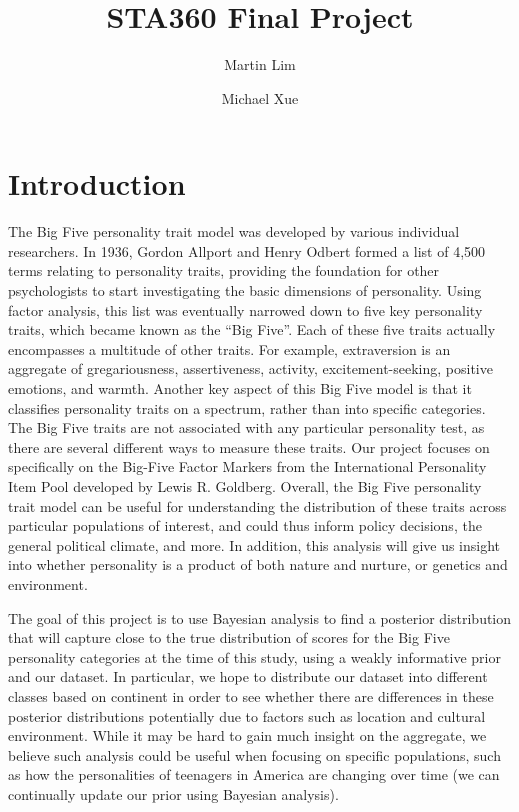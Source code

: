\documentclass[
]{article}
\title{STA360 Final Project}
\author{Martin Lim \and Michael Xue}
\date{}
\begin{document}
\maketitle

\hypertarget{introduction}{%
\section{Introduction}\label{introduction}}

The Big Five personality trait model was developed by various individual
researchers. In 1936, Gordon Allport and Henry Odbert formed a list of
4,500 terms relating to personality traits, providing the foundation for
other psychologists to start investigating the basic dimensions of
personality. Using factor analysis, this list was eventually narrowed
down to five key personality traits, which became known as the ``Big
Five''. Each of these five traits actually encompasses a multitude of
other traits. For example, extraversion is an aggregate of
gregariousness, assertiveness, activity, excitement-seeking, positive
emotions, and warmth. Another key aspect of this Big Five model is that
it classifies personality traits on a spectrum, rather than into
specific categories. The Big Five traits are not associated with any
particular personality test, as there are several different ways to
measure these traits. Our project focuses on specifically on the
Big-Five Factor Markers from the International Personality Item Pool
developed by Lewis R. Goldberg. Overall, the Big Five personality trait
model can be useful for understanding the distribution of these traits
across particular populations of interest, and could thus inform policy
decisions, the general political climate, and more. In addition, this
analysis will give us insight into whether personality is a product of
both nature and nurture, or genetics and environment.

The goal of this project is to use Bayesian analysis to find a posterior
distribution that will capture close to the true distribution of scores
for the Big Five personality categories at the time of this study, using
a weakly informative prior and our dataset. In particular, we hope to
distribute our dataset into different classes based on continent in
order to see whether there are differences in these posterior
distributions potentially due to factors such as location and cultural
environment. While it may be hard to gain much insight on the aggregate,
we believe such analysis could be useful when focusing on specific
populations, such as how the personalities of teenagers in America are
changing over time (we can continually update our prior using Bayesian
analysis).
\end{document}
